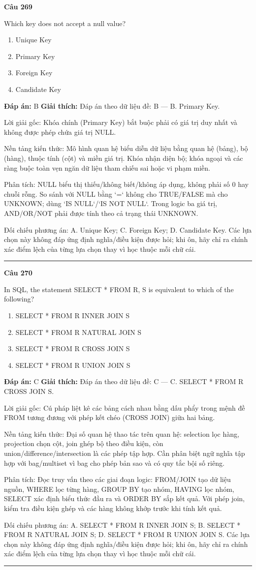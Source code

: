 \documentclass[11pt,a4paper]{article}
\newenvironment{question}[1]{%
  \par\vspace{1em}\noindent\textbf{\large Câu #1}\par\vspace{0.4em}
}{%
  \par\vspace{1em}\hrule\vspace{0.6em}
}
\newenvironment{choices}{%
  \begin{enumerate}[label=\textbf{\Alph*.},leftmargin=2.2em,itemsep=2pt,topsep=3pt]
}{%
  \end{enumerate}
}
\newcommand{\choice}{\item}
\begin{document}
\begin{question}{269}
Which key does not accept a null value?
\begin{choices}
\choice Unique Key
\choice Primary Key
\choice Foreign Key
\choice Candidate Key
\end{choices}
\textbf{Đáp án:} B
\textbf{Giải thích:} Đáp án theo dữ liệu đề: B — B. Primary Key.

Lời giải gốc: Khóa chính (Primary Key) bắt buộc phải có giá trị duy nhất và không được phép chứa giá trị NULL.

Nền tảng kiến thức: Mô hình quan hệ biểu diễn dữ liệu bằng quan hệ (bảng), bộ (hàng), thuộc tính (cột) và miền giá trị. Khóa nhận diện bộ; khóa ngoại và các ràng buộc toàn vẹn ngăn dữ liệu tham chiếu sai hoặc vi phạm miền.

Phân tích: NULL biểu thị thiếu/không biết/không áp dụng, không phải số 0 hay chuỗi rỗng. So sánh với NULL bằng `=` không cho TRUE/FALSE mà cho UNKNOWN; dùng `IS NULL`/`IS NOT NULL`. Trong logic ba giá trị, AND/OR/NOT phải được tính theo cả trạng thái UNKNOWN.

Đối chiếu phương án: A. Unique Key; C. Foreign Key; D. Candidate Key. Các lựa chọn này không đáp ứng định nghĩa/điều kiện được hỏi; khi ôn, hãy chỉ ra chính xác điểm lệch của từng lựa chọn thay vì học thuộc mỗi chữ cái.
\end{question}

\begin{question}{270}
In SQL, the statement SELECT * FROM R, S is equivalent to which of the following?
\begin{choices}
\choice SELECT * FROM R INNER JOIN S
\choice SELECT * FROM R NATURAL JOIN S
\choice SELECT * FROM R CROSS JOIN S
\choice SELECT * FROM R UNION JOIN S
\end{choices}
\textbf{Đáp án:} C
\textbf{Giải thích:} Đáp án theo dữ liệu đề: C — C. SELECT * FROM R CROSS JOIN S.

Lời giải gốc: Cú pháp liệt kê các bảng cách nhau bằng dấu phẩy trong mệnh đề FROM tương đương với phép kết chéo (CROSS JOIN) giữa hai bảng.

Nền tảng kiến thức: Đại số quan hệ thao tác trên quan hệ: selection lọc hàng, projection chọn cột, join ghép bộ theo điều kiện, còn union/difference/intersection là các phép tập hợp. Cần phân biệt ngữ nghĩa tập hợp với bag/multiset vì bag cho phép bản sao và có quy tắc bội số riêng.

Phân tích: Đọc truy vấn theo các giai đoạn logic: FROM/JOIN tạo dữ liệu nguồn, WHERE lọc từng hàng, GROUP BY tạo nhóm, HAVING lọc nhóm, SELECT xác định biểu thức đầu ra và ORDER BY sắp kết quả. Với phép join, kiểm tra điều kiện ghép và các hàng không khớp trước khi tính kết quả.

Đối chiếu phương án: A. SELECT * FROM R INNER JOIN S; B. SELECT * FROM R NATURAL JOIN S; D. SELECT * FROM R UNION JOIN S. Các lựa chọn này không đáp ứng định nghĩa/điều kiện được hỏi; khi ôn, hãy chỉ ra chính xác điểm lệch của từng lựa chọn thay vì học thuộc mỗi chữ cái.
\end{question}
\end{document}
